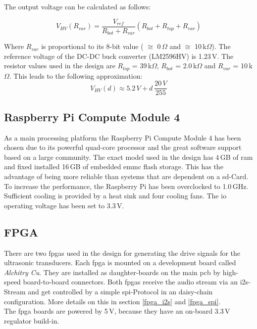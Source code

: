 The output voltage can be calculated as follows:

\begin{equation}
    V_{HV}(R_{var}) = \frac{V_{ref}}{R_{bot} + R_{var}} (R_{bot} + R_{top} + R_{var})
\end{equation}

Where $R_{var}$ is proportional to its 8-bit value ( $\cong$ 0\,$\Omega$ and  $\cong$ 10\,k$\Omega$). The reference voltage of the DC-DC buck converter (LM2596HV) is 1.23\,V. The resistor values used in the design are $R_{top}$ = 39\,k$\Omega$, $R_{bot}$ = 2.0\,k$\Omega$ and $R_{var}$ = 10\,k$\Omega$. This leads to the following approximation:
 \begin{equation}
    V_{HV}(d) \approx 5.2\,V + d\:\frac{20\,V}{255}
\end{equation}

\subsection{Raspberry Pi Compute Module 4}
As a main processing platform the Raspberry Pi Compute Module 4 has been chosen due to its powerful quad-core processor and the great software support based on a large community. The exact model used in the design has 4\,GB of \acrshort{ram} and fixed installed 16\,GB of embedded \acrshort{emmc} flash storage. This has the advantage of being more reliable than systems that are dependent on a \acrshort{sd}-Card.
To increase the performance, the Raspberry Pi has been overclocked to 1.0\,GHz. Sufficient cooling is provided by a heat sink and four cooling fans.
The \acrshort{io} operating voltage has been set to 3.3\,V.

\subsection{FPGA} \label{hardware_fpga}
There are two \acrshort{fpga}s used in the design for generating the drive signals for the ultrasonic transducers. Each \acrshort{fpga} is mounted on a development board called \textit{Alchitry Cu}. They are installed as daughter-boards on the main \acrshort{pcb} by high-speed board-to-board connectors. Both \acrshort{fpga}s receive the audio stream via an \acrshort{i2s}-Stream and get controlled by a simple \acrshort{spi}-Protocol in an daisy-chain configuration. More details on this in section \ref{fpga_i2s} and \ref{fpga_spi}.\\
The \acrshort{fpga} boards are powered by 5\,V, because they have an on-board 3.3\,V regulator build-in.


